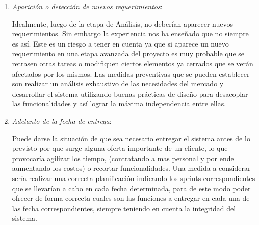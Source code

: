 \begin{enumerate}
\item \textit{Aparición o detección de nuevos requerimientos}:

Idealmente, luego de la etapa de Análisis, no deberían aparecer nuevos requerimientos. Sin embargo  la experiencia nos ha enseñado que no siempre es así. Este es un riesgo a tener en cuenta ya que si aparece un nuevo requerimiento en una etapa avanzada del proyecto es muy probable que se retrasen otras tareas o modifiquen ciertos elementos ya cerrados que se verán afectados por los mismos. Las medidas preventivas que se pueden establecer son realizar un análisis exhaustivo de las necesidades del mercado y desarrollar el sistema utilizando buenas prácticas de diseño para desacoplar las funcionalidades y así lograr la máxima independencia entre ellas.

\item \textit{Adelanto de la fecha de entrega}:

Puede darse la situación de que sea necesario entregar el sistema antes de lo previsto por que surge alguna oferta importante de un cliente, lo que provocaría agilizar los tiempo, (contratando a mas personal y por ende aumentando los costos) o recortar funcionalidades. Una medida a considerar sería  realizar una correcta planificación indicando los sprints correspondientes que se llevarían a cabo en cada fecha determinada, para de este modo poder ofrecer de forma correcta cuales son las funciones a entregar en cada una de las fecha correspondientes, siempre teniendo en cuenta la integridad del sistema.
\end{enumerate}

